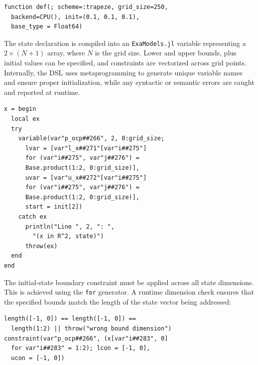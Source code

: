 {\small
\begin{verbatim}
function def(; scheme=:trapeze, grid_size=250,
  backend=CPU(), init=(0.1, 0.1, 0.1),
  base_type = Float64)
\end{verbatim}
}

\noindent The state declaration is compiled into an \texttt{ExaModels.jl} variable representing a $2 \times (N + 1)$ array, where $N$ is the grid size. Lower and upper bounds, plus initial values can be specified, and constraints are vectorized across grid points. Internally, the DSL uses metaprogramming to generate unique variable names and ensure proper initialization, while any syntactic or semantic errors are caught and reported at runtime.

{\small
\begin{verbatim}
x = begin
  local ex
  try
    variable(var"p_ocp##266", 2, 0:grid_size;
      lvar = [var"l_x##271"[var"i##275"]
      for (var"i##275", var"j##276") =
      Base.product(1:2, 0:grid_size)],
      uvar = [var"u_x##272"[var"i##275"]
      for (var"i##275", var"j##276") =
      Base.product(1:2, 0:grid_size)],
      start = init[2])
    catch ex
      println("Line ", 2, ": ",
        "(x in R^2, state)")
      throw(ex)
  end
end
\end{verbatim}
}


\noindent The initial-state boundary constraint must be applied across all state dimensions. This is achieved using the \verb+for+ generator.
A runtime dimension check ensures that the specified bounds match the length of the state vector being addressed:
{\small
\begin{verbatim}
length([-1, 0]) == length([-1, 0]) ==
  length(1:2) || throw("wrong bound dimension")
constraint(var"p_ocp##266", (x[var"i##283", 0]
  for var"i##283" = 1:2); lcon = [-1, 0],
  ucon = [-1, 0])
\end{verbatim}
}


